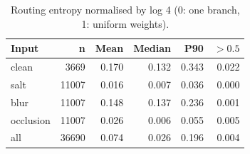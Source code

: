 \begin{table}[t]
\centering
\caption{Routing entropy normalised by log 4 (0: one branch, 1: uniform weights).}
\label{tab:task3_routing_entropy}
\begin{tabular}{lrrrrr}
\toprule
Input & n & Mean & Median & P90 & $>0.5$ \\
\midrule
clean & 3669 & 0.170 & 0.132 & 0.343 & 0.022 \\
salt & 11007 & 0.016 & 0.007 & 0.036 & 0.000 \\
blur & 11007 & 0.148 & 0.137 & 0.236 & 0.001 \\
occlusion & 11007 & 0.026 & 0.006 & 0.055 & 0.005 \\
all & 36690 & 0.074 & 0.026 & 0.196 & 0.004 \\
\bottomrule
\end{tabular}
\end{table}
